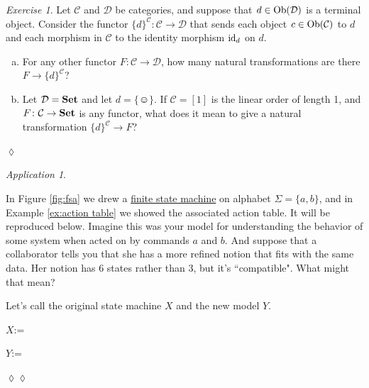 \documentclass{book}
\def\tn{\textnormal}
\def\mc{\mathcal}
\def\Ob{\tn{Ob}}
\def\hsp{\hspace{.3in}}
\def\singleton{\{\smiley\}}
\newcommand{\boxtitle}[1]{\begin{center}#1\end{center}\vspace{-.1in}}
\def\to{\rightarrow}
\def\taking{\colon}
\def\id{\tn{id}}
\def\Set{{\bf Set}}
\def\mcC{\mc{C}}
\def\mcD{\mc{D}}
\theoremstyle{remark}
\newtheorem{exc}[subsubsection]{Exercise}
\newenvironment{exercise}{\begin{exc}}{\hspace*{\fill}$\lozenge$\end{exc}}
\newtheorem{app}[subsubsection]{Application}
\newenvironment{application}{\begin{app}}{\hspace*{\fill}$\lozenge\lozenge$\end{app}}
\theoremstyle{definition}
\def\sexc{\begin{enumerate}[a.)]\setlength{\itemsep}{.1cm}\setlength{\parskip}{.1cm}\item}
\def\next{\item}
\def\endsexc{\end{enumerate}}
\begin{document}
\begin{exercise}
Let $\mcC$ and $\mcD$ be categories, and suppose that $d\in\Ob(\mcD)$ is a terminal object. Consider the functor $\{d\}^\mcC\taking\mcC\to\mcD$ that sends each object $c\in\Ob(\mcC)$ to $d$ and each morphism in $\mcC$ to the identity morphism $\id_d$ on $d$. 
\sexc For any other functor $F\taking\mcC\to\mcD$, how many natural transformations are there $F\to\{d\}^\mcC$? 
\next Let $\mcD=\Set$ and let $d=\singleton$. If $\mcC=[1]$ is the linear order of length 1, and $F\taking\mcC\to\Set$ is any functor, what does it mean to give a natural transformation $\{d\}^\mcC\to F$?
\endsexc
\end{exercise}

\begin{application}\label{app:change of fsm}

In Figure \ref{fig:fsa} we drew a \href{http://en.wikipedia.org/wiki/Finite-state_machine}{finite state machine} on alphabet $\Sigma=\{a,b\}$, and in Example \ref{ex:action table} we showed the associated action table. It will be reproduced below. Imagine this was your model for understanding the behavior of some system when acted on by commands $a$ and $b$. And suppose that a collaborator tells you that she has a more refined notion that fits with the same data. Her notion has 6 states rather than 3, but it's ``compatible". What might that mean? 

Let's call the original state machine $X$ and the new model $Y$.

\begin{center}
\parbox{1.9in}{\boxtitle{$X$:=}}
\hsp
\parbox{2.6in}{\boxtitle{$Y$:=}}
\end{center}


\end{application}
\end{document}
